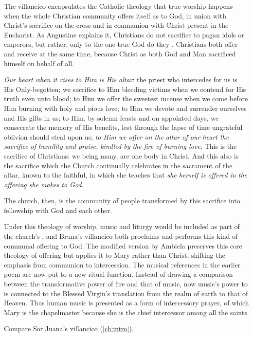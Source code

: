 The villancico encapsulates the Catholic theology that true worship happens
when the whole Christian community offers itself as 
 to God, in union with Christ's sacrifice on the cross and
in communion with Christ present in the Eucharist.
As Augustine explains it, Christians do not sacrifice to pagan idols or
emperors, but rather, only to the one true God do they .%
    \Autocite[10:3]{Augustine:CityofGod}
Christians both offer and receive at the same time, because Christ as both God
and Man sacrificed himself on behalf of all.
\begin{quoting}
    \emph{Our heart when it rises to Him is His altar}: the priest who
    intercedes for us is His Only-begotten; we sacrifice to Him bleeding
    victims when we contend for His truth even unto blood; to Him we offer the
    sweetest incense when we come before Him burning with holy and pious love;
    to Him we devote and surrender ourselves and His gifts in us; to Him, by
    solemn feasts and on appointed days, we consecrate the memory of His
    benefits, lest through the lapse of time ungrateful oblivion should steal
    upon us; \emph{to Him we offer on the altar of our heart the sacrifice of
    humility and praise, kindled by the fire of burning love.}
    This is the sacrifice of Christians: we being many, are one body in Christ.
    And this also is the sacrifice which the Church continually celebrates in
    the sacrament of the altar, known to the faithful, in which she teaches
    that \emph{she herself is offered in the offering she makes to God}.%
        \Autocite[10:6, emphasis added]{Augustine:CityofGod}
\end{quoting}
The church, then, is the community of people transformed by this sacrifice into
fellowship with God and each other.

Under this theology of worship, music and liturgy would be included as part of
the church's , and Bruna's
villancico both proclaims and performs this kind of communal offering to God.
The modified version by Ambiela preserves this core theology of offering but
applies it to Mary rather than Christ, shifting the emphasis from communion to
intercession.
The musical references in the earlier poem are now put to a new ritual function.
Instead of drawing a comparison between the transformative power of fire and
that of music, now music's power to  is connected to
the Blessed Virgin's translation from the realm of earth to that of Heaven.
Thus human music is presented as a form of intercessory prayer, of which Mary
is the chapelmaster because she is the chief intercessor among all the saints.%
\begin{Footnote}
    Compare Sor Juana's villancico 
    (\cref{ch:intro}).
\end{Footnote}

